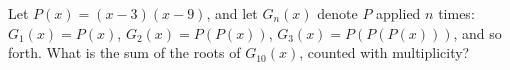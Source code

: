 Let $P(x)=(x-3)(x-9)$, and let $G_n(x)$ denote $P$ applied $n$ times: $G_1(x)=P(x)$, $G_2(x)=P(P(x))$, $G_3(x)=P(P(P(x)))$, and so forth. What is the sum of the roots of $G_{10}(x)$, counted with multiplicity?
